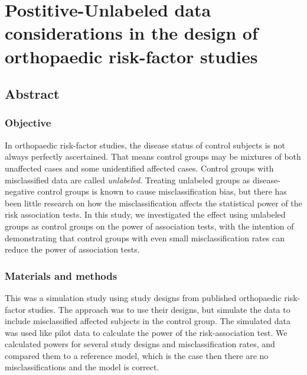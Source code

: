 \documentclass[
]{article}
\author{}
\date{\vspace{-2.5em}}
\begin{document}
\hypertarget{postitive-unlabeled-data-considerations-in-the-design-of-orthopaedic-risk-factor-studies}{%
\section{Postitive-Unlabeled data considerations in the design of
orthopaedic risk-factor
studies}\label{postitive-unlabeled-data-considerations-in-the-design-of-orthopaedic-risk-factor-studies}}

\hypertarget{abstract}{%
\subsection{Abstract}\label{abstract}}

\hypertarget{objective}{%
\subsubsection{Objective}\label{objective}}

In orthopaedic risk-factor studies, the disease status of control
subjects is not always perfectly ascertained. That means control groups
may be mixtures of both unaffected cases and some unidentified affected
cases. Control groups with misclassified data are called
\emph{unlabeled}. Treating unlabeled groups as disease-negative control
groups is known to cause misclassification bias, but there has been
little research on how the misclassification affects the statistical
power of the risk association tests. In this study, we investigated the
effect using unlabeled groups as control groups on the power of
association tests, with the intention of demonstrating that control
groups with even small misclassification rates can reduce the power of
association tests.

\hypertarget{materials-and-methods}{%
\subsubsection{Materials and methods}\label{materials-and-methods}}

This was a simulation study using study designs from published
orthopaedic risk-factor studies. The approach was to use their designs,
but simulate the data to include misclassified affected subjects in the
control group. The simulated data was used like pilot data to calculate
the power of the risk-association test. We calculated powers for several
study designs and misclassification rates, and compared them to a
reference model, which is the case then there are no misclassifications
and the model is correct.
\end{document}
